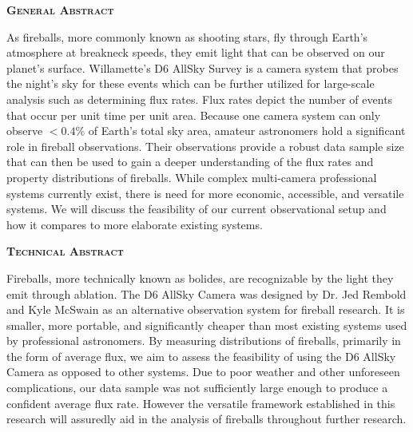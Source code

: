 \begin{flushleft}

\textbf{\textsc{\LARGE General Abstract}}

\vspace{0.2 in}

As fireballs, more commonly known as shooting stars, fly through Earth’s atmosphere at breakneck speeds, they emit light that can be observed on our planet’s surface. Willamette’s D6 AllSky Survey is a camera system that probes the night’s sky for these events which can be further utilized for large-scale analysis such as determining flux rates. Flux rates depict the number of events that occur per unit time per unit area. Because one camera system can only observe $<0.4\%$ of Earth’s total sky area, amateur astronomers hold a significant role in fireball observations. Their observations provide a robust data sample size that can then be used to gain a deeper understanding of the flux rates and property distributions of fireballs. While complex multi-camera professional systems currently exist, there is need for more economic, accessible, and versatile systems. We will discuss the feasibility of our current observational setup and how it compares to more elaborate existing systems.
\vspace{0.25 in}

\textbf{\textsc{\LARGE Technical Abstract}}

\vspace{0.2 in}

Fireballs, more technically known as bolides, are recognizable by the light they emit through ablation.  The D6 AllSky Camera was designed by Dr. Jed Rembold and Kyle McSwain as an alternative observation system for fireball research.  It is smaller, more portable, and significantly cheaper than most existing systems used by professional astronomers.  By measuring distributions of fireballs, primarily in the form of average flux, we aim to assess the feasibility of using the D6 AllSky Camera as opposed to other systems.  Due to poor weather and other unforeseen complications, our data sample was not sufficiently large enough to produce a confident average flux rate.  However the versatile framework established in this research will assuredly aid in the analysis of fireballs throughout further research.

\end{flushleft}
